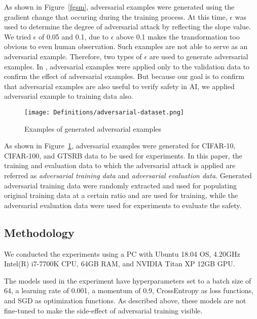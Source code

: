 \documentclass[symmetry,article,submit,moreauthors,pdftex]{Definitions/mdpi}
\begin{document}
As shown in Figure~\ref{fgsm}, adversarial examples were generated using the gradient change that occuring during the training process.
At this time, \begin{math}\epsilon\end{math} was used to determine the degree of adversarial attack by reflecting the slope value.
We tried \begin{math}\epsilon\end{math} of 0.05 and 0.1, due to \begin{math}\epsilon\end{math} above 0.1 makes the transformation too obvious to even human observation. Such examples are not able to serve as an adversarial example. Therefore, two types of \begin{math}\epsilon\end{math} are used to generate adversarial examples.
In \cite{adversarial-goodfellow}, adversarial examples were applied only to the validation data to confirm the effect of adversarial examples. But because our goal is to confirm that adversarial examples are also useful to verify safety in AI, we applied adversarial example to training data also. 
\begin{figure}[H]
\texttt{[image: Definitions/adversarial-dataset.png]}
\caption{Examples of generated adversarial examples\label{adversarial-examples}}
\end{figure} 

As shown in Figure~\ref{adversarial-examples}, adversarial examples were generated for CIFAR-10, CIFAR-100, and GTSRB data to be used for experiments.
In this paper, the training and evaluation data to which the adversarial attack is applied are referred as {\it adversarial training data} and {\it adversarial evaluation data}.
Generated adversarial training data were randomly extracted and used for populating original training data at a certain ratio and are used for training, while the adversarial evaluation data were used for experiments to evaluate the safety.

\subsection{Methodology}

We conducted the experiments using a PC with Ubuntu 18.04 OS, 4.20GHz Intel(R) i7-7700K CPU, 64GB RAM, and NVIDIA Titan XP 12GB GPU.

The models used in the experiment have hyperparameters set to a batch size of 64, a learning rate of 0.001, a momentum of 0.9, CrossEntropy as loss functions, and SGD as optimization functions. As described above, these models are not fine-tuned to make the side-effect of adversarial training visible.
\end{document}
